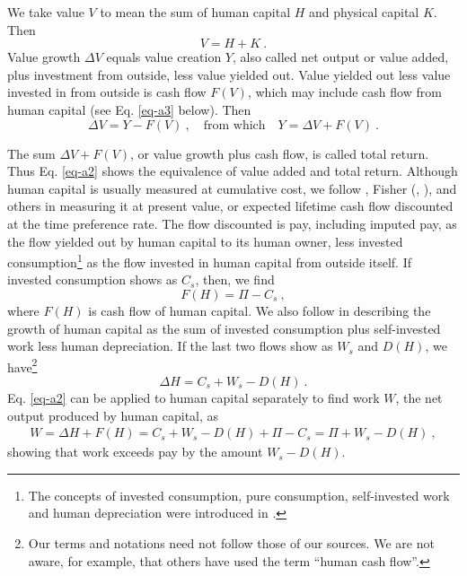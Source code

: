 \documentclass[a4paper,fleqn]{cas-sc}
\begin{document}
%
We take value $V$ to mean the sum of human capital $H$ and physical capital $K$. Then
\begin{equation}
V = H + K\ . \label{eq-a1}
\end{equation}
%
Value growth $\Delta V$ equals value creation $Y$, also called net output or value added, plus investment from outside, less value yielded out. Value yielded out less value invested in from outside is cash flow $F(V)$, which may include cash flow from human capital (see Eq. \ref{eq-a3} below). Then
\begin{equation}
\Delta V = Y - F(V) \ , \quad \text{from which} \quad Y = \Delta V + F(V) \ . \label{eq-a2}
\end{equation}

The sum $\Delta V + F(V)$, or value growth plus cash flow, is called total return. Thus Eq. \eqref{eq-a2} shows the equivalence of value added and total return.
Although human capital is usually measured at cumulative cost, we follow \cite{petty1664verbum}, Fisher (\citeyear{fisher1907}, \citeyear{fisher1930}), \cite{mincer1958} and others in measuring it at present value, or expected lifetime cash flow discounted at the time preference rate. The flow discounted is pay, including imputed pay, as the flow yielded out by human capital to its human owner, less invested consumption\footnote{The concepts of invested consumption, pure consumption, self-invested work and human depreciation were introduced in \cite{schultz1961}.} as the flow invested in human capital from outside itself. If invested consumption shows as $C_s$, then, we find
\begin{equation}
F(H) = \Pi - C_s \ , \label{eq-a3}
\end{equation}
where $F(H)$ is cash flow of human capital. We also follow \cite{ben-porath1967} in describing the growth of human capital as the sum of invested consumption plus self-invested work less human depreciation. If the last two flows show as $W_s$ and $D(H)$, we have\footnote{Our terms and notations need not follow those of our sources. We are not aware, for example, that others have used the term “human cash flow”.}
\begin{equation}
\Delta H = C_s + W_s - D(H) \ . \label{eq-a4}
\end{equation}
Eq. \eqref{eq-a2} can be applied to human capital separately to find work $W$, the net output produced by human capital, as 
\begin{align}
W = \Delta H + F(H) = C_s + W_s - D(H) + \Pi - C_s = \Pi + W_s - D(H) \ , \label{eq-a5}
\end{align}
showing that work exceeds pay by the amount $W_s - D(H)$.
\end{document}
